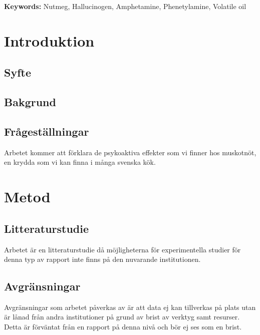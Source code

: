 \documentclass{theme/franska}
\begin{document}
	\begin{flushleft}
		{\small {\bf Keywords:} Nutmeg, Hallucinogen, Amphetamine, Phenetylamine, Volatile oil}
	\end{flushleft}


	\tableofcontents

	\clearpage

	\section{Introduktion}
	\subsection{Syfte}

	\subsection{Bakgrund}

	\subsection{Frågeställningar}

%
%
%
Arbetet kommer att förklara de psykoaktiva effekter som vi finner hos muskotnöt, en krydda som vi kan finna i många svenska kök.

	\section{Metod}%

\subsection{Litteraturstudie}
	Arbetet är en litteraturstudie då möjligheterna för experimentella studier för denna typ av rapport inte finns på den nuvarande institutionen.
	\subsection{Avgränsningar}
Avgränsningar som arbetet påverkas av är att data ej kan tillverkas på plats utan
är lånad från andra institutioner på grund av brist av verktyg samt resurser.
Detta är förväntat från en rapport på denna nivå och bör ej ses som en brist.
\end{document}
